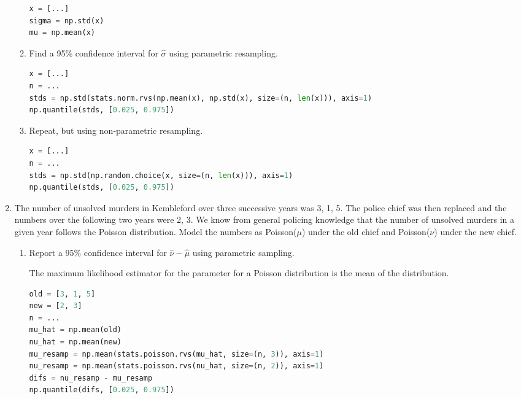 \documentclass[10pt,\jkfside,a4paper]{article}
\begin{document}
\begin{enumerate}
\begin{enumerate}
\fi

\begin{lstlisting}[language=Python]
x = [...]
sigma = np.std(x)
mu = np.mean(x)
\end{lstlisting}

\item Find a 95\% confidence interval for $\hat{\sigma}$ using parametric
resampling.

\begin{lstlisting}[language=Python]
x = [...]
n = ...
stds = np.std(stats.norm.rvs(np.mean(x), np.std(x), size=(n, len(x))), axis=1)
np.quantile(stds, [0.025, 0.975])
\end{lstlisting}

\item Repeat, but using non-parametric resampling.

\begin{lstlisting}[language=Python]
x = [...]
n = ...
stds = np.std(np.random.choice(x, size=(n, len(x))), axis=1)
np.quantile(stds, [0.025, 0.975])
\end{lstlisting}

\end{enumerate}

\item The number of unsolved murders in Kembleford over three successive
years was 3, 1, 5. The police chief was then replaced and the numbers over
the following two years were 2, 3. We know from general policing knowledge
that the number of unsolved murders in a given year follows the Poisson
distribution. Model the numbers as Poisson($\mu$) under the old chief and
Poisson($\nu$) under the new chief.

\begin{enumerate}

\item Report a 95\% confidence interval for $\hat{\nu} - \hat{\mu}$ using
parametric sampling.

The maximum likelihood estimator for the parameter for a Poisson distribution
is the mean of the distribution.

\begin{lstlisting}[language=Python]
old = [3, 1, 5]
new = [2, 3]
n = ...
mu_hat = np.mean(old)
nu_hat = np.mean(new)
mu_resamp = np.mean(stats.poisson.rvs(mu_hat, size=(n, 3)), axis=1)
nu_resamp = np.mean(stats.poisson.rvs(nu_hat, size=(n, 2)), axis=1)
difs = nu_resamp - mu_resamp
np.quantile(difs, [0.025, 0.975])
\end{lstlisting}


\end{enumerate}
\end{enumerate}
\end{document}
